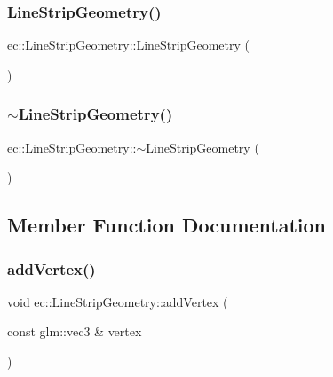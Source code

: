 \subsubsection{\texorpdfstring{Line\+Strip\+Geometry()}{LineStripGeometry()}}
{\footnotesize\ttfamily ec\+::\+Line\+Strip\+Geometry\+::\+Line\+Strip\+Geometry (\begin{DoxyParamCaption}{ }\end{DoxyParamCaption})\hspace{0.3cm}{\ttfamily [explicit]}}

\mbox{\label{classec_1_1_line_strip_geometry_a2fcbc3ebbd2318f00da14dbf7a2c87f3}} 
\subsubsection{\texorpdfstring{$\sim$\+Line\+Strip\+Geometry()}{~LineStripGeometry()}}
{\footnotesize\ttfamily ec\+::\+Line\+Strip\+Geometry\+::$\sim$\+Line\+Strip\+Geometry (\begin{DoxyParamCaption}{ }\end{DoxyParamCaption})\hspace{0.3cm}{\ttfamily [default]}}



\subsection{Member Function Documentation}
\mbox{\label{classec_1_1_line_strip_geometry_a185da594a28585dabc17874a59cfe7ef}} 
\subsubsection{\texorpdfstring{add\+Vertex()}{addVertex()}}
{\footnotesize\ttfamily void ec\+::\+Line\+Strip\+Geometry\+::add\+Vertex (\begin{DoxyParamCaption}\item[{const glm\+::vec3 \&}]{vertex }\end{DoxyParamCaption})}

